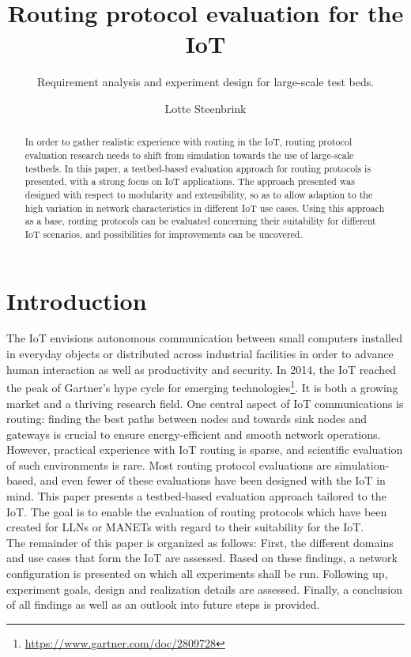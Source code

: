 \documentclass{acm_proc_article-sp}
\begin{document}
\title{Routing protocol evaluation for the IoT}
\subtitle{Requirement analysis and experiment design for large-scale test beds.}

\author{
\alignauthor
Lotte Steenbrink
}

\maketitle
\begin{abstract}
In order to gather realistic experience with routing in the IoT, routing protocol evaluation research needs to shift from simulation towards the use of large-scale testbeds.
In this paper, a testbed-based evaluation approach for routing protocols is presented, with a strong focus on IoT applications. The approach presented was designed with respect to modularity and extensibility, so as to allow adaption to the high variation in network characteristics in different IoT use cases. Using this approach as a base, routing protocols can be evaluated concerning their suitability for different IoT scenarios, and possibilities for improvements can be uncovered.
\end{abstract}


\section{Introduction}
\label{sec:Intro}
The \gls{IoT} envisions autonomous communication between small computers installed in everyday objects or distributed across industrial facilities in order to advance human interaction as well as productivity and security.
In 2014, the \gls{IoT} reached the peak of Gartner's hype cycle for emerging technologies\footnote{ \url{https://www.gartner.com/doc/2809728}}. It is both a growing market and a thriving research field. One central aspect of IoT communications is routing: finding the best paths between nodes and towards sink nodes and gateways is crucial to ensure energy-efficient and smooth network operations. However, practical experience with IoT routing is sparse, and scientific evaluation of such environments is rare. Most routing protocol evaluations are simulation-based, and even fewer of these evaluations have been designed with the IoT in mind.
This paper presents a testbed-based evaluation approach tailored to the IoT. The goal is to enable the evaluation of routing protocols which have been created for \glspl{LLN} or \glspl{MANET} with regard to their suitability for the IoT.\\
The remainder of this paper is organized as follows:
First, the different domains and use cases that form the IoT are assessed. Based on these findings, a network configuration is presented on which all experiments shall be run. Following up, experiment goals, design and realization details are assessed. Finally, a conclusion of all findings as well as an outlook into future steps is provided.
\end{document}
